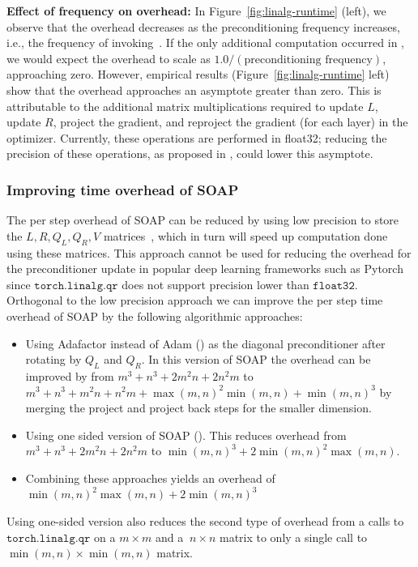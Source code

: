 \documentclass{article} %
\begin{document}
\textbf{Effect of frequency on  overhead:} In Figure~\ref{fig:linalg-runtime}
 (left), we observe that the overhead decreases as the preconditioning frequency increases, i.e., the frequency of invoking~. If the only additional computation occurred in , we would expect the overhead to scale as $1.0/(\text{preconditioning frequency})$, approaching zero. However, empirical results (Figure~\ref{fig:linalg-runtime} left) show that the overhead approaches an asymptote greater than zero. This is attributable to the additional matrix multiplications required to update $L$, update $R$, project the gradient, and reproject the gradient (for each layer) in the optimizer. Currently, these operations are performed in float32; reducing the precision of these operations, as proposed in \cite{4bitshampoo}, could lower this asymptote.

\subsubsection{Improving time overhead of SOAP}
\label{app:impr-time}
The per step overhead of SOAP can be reduced by using low precision to store the $L, R, Q_L, Q_R, V$ matrices~\citep{8bitadam,4bitshampoo}, which in turn will speed up computation done using these matrices. This approach cannot be used for reducing the overhead for the preconditioner update in popular deep learning frameworks such as Pytorch since $\texttt{torch.linalg.qr}$ does not support precision lower than $\texttt{float32}$. Orthogonal to the low precision approach we can improve the per step time overhead of SOAP by the following algorithmic approaches:
\begin{itemize}
    \item Using Adafactor instead of Adam () as the diagonal preconditioner after rotating by $Q_L$ and $Q_R$. In this version of SOAP the overhead can be improved by from $m^3+n^3+2m^2n+2n^2m$ to $m^3+n^3+m^2n+n^2m+\max(m, n)^2\min(m, n) + \min(m, n)^3$ by merging the project and project back steps for the smaller dimension.
    \item Using one sided version of SOAP (). This reduces overhead from $m^3+n^3+2m^2n+2n^2m$ to $\min(m, n)^3+2\min(m, n)^2\max(m, n)$. 
    \item Combining these approaches yields an overhead of $\min(m, n)^2\max(m, n)+2 \min(m, n)^3$
\end{itemize} 

Using one-sided version also reduces the second type of overhead from a calls to $\texttt{torch.linalg.qr}$ on a $m \times m$ and a $\ n \times n$ matrix to only a single call to $\min(m, n) \times \min(m, n)$ matrix.
\end{document}
